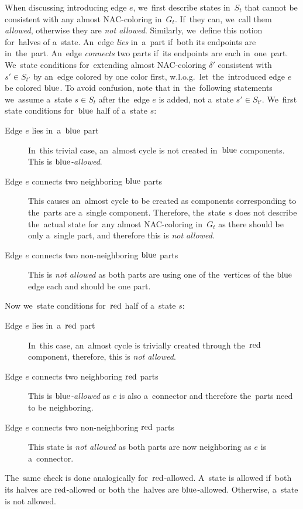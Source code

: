 When discussing \IntroduceEdgeNode{} introducing edge \( e \),
we~first describe states in~\( S_{t} \)
that cannot be consistent with any almost NAC-coloring in~\( G_t \).
If~they can, we~call them \emph{allowed}, otherwise they are \emph{not allowed}.
Similarly, we~define this notion for~halves of a~state.
%
An~edge \emph{lies} in~a~part if~both its endpoints are in~the~part.
An~edge \emph{connects} two parts if~its endpoints are each in~one~part.
%
We~state conditions for~extending almost NAC-coloring \( \delta' \)
consistent with \( s' \in S_{t'} \)
by an~edge colored by one color first,
w.l.o.g.\ let~the~introduced edge \( e \) be colored \( \text{blue} \).
%
To avoid confusion, note that in~the~following statements we~assume
a~state \( s \in S_t \) after the~edge \( e \) is added, not a~state \( s' \in S_{t'} \).
%
We~first state conditions for~\( \text{blue} \) half of a~state \( s \):
%
\begin{description}
	\item[Edge \( e \) lies in~a~\( \text{blue} \) part]
	      In~this trivial case, an~almost cycle is not created in~\( \text{blue} \) components.
	      This is \emph{\( \text{blue} \)-allowed}.
	\item[Edge \( e \) connects two neighboring \( \text{blue} \) parts]
	      This causes an~almost cycle to be created as
	      components corresponding to the~parts
	      are a~single component.
	      Therefore, the~state \( s \) does not describe
	      the~actual state for~any almost NAC-coloring in~\( G_t \)
	      as there should be only a~single part, and therefore this is \emph{not allowed}.
	\item[Edge \( e \) connects two non-neighboring \( \text{blue} \) parts]
	      This is \emph{not allowed} as both parts
	      are using one of the~vertices of the \( \text{blue} \) edge each
				and should be one part.
\end{description}
%
Now we~state conditions for~\( \text{red} \) half of a~state \( s \):
%
\begin{description}
	\item[Edge \( e \) lies in~a~\( \text{red} \) part]
	      In~this case, an~almost cycle is trivially created
	      through the~\( \text{red} \) component,
	      therefore, this is \emph{not allowed}.
	\item[Edge \( e \) connects two neighboring \( \text{red} \) parts]
	      This is \emph{\( \text{blue} \)-allowed} as \( e \) is also a~connector and
	      therefore the~parts need to be neighboring.
	\item[Edge \( e \) connects two non-neighboring \( \text{red} \) parts]
	      This state is \emph{not allowed} as both parts
	      are now neighboring as \( e \) is a~connector.
\end{description}
%
The~same check is done analogically for~\( \text{red} \)-allowed.
A~state is allowed if~both its halves are \( \text{red} \)-allowed or
both the~halves are \( \text{blue} \)-allowed.
Otherwise, a~state is not allowed.

